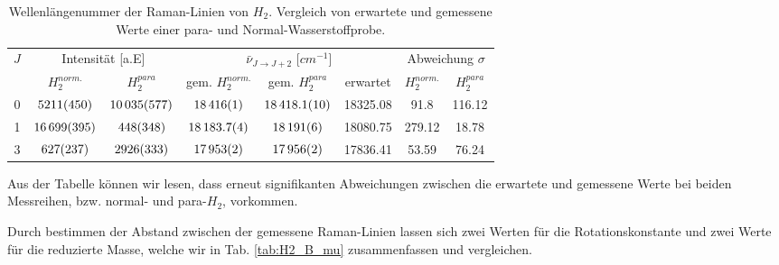 \documentclass[11 pt]{article}
\begin{document}
\begin{table}[!htbp]
 \begin{center}
  \caption{\small Wellenlängenummer der Raman-Linien von $H_2$. Vergleich von erwartete und gemessene Werte einer para- und Normal-Wasserstoffprobe.}
  \label{tab:H2}
  \renewcommand{\arraystretch}{1.3} %
  \begin{tabular}{|c|c|c|c|c|c|c|c|}
  \hline
\multirow{2}{*}{$J$}&\multicolumn{2}{c|}{Intensität [a.E]}& \multicolumn{3}{c|}{$\bar{\nu}_{J\to J+2}$ [$\unit{cm^{-1}}$]} & \multicolumn{2}{c|}{ Abweichung $\sigma$} \\ \cline{2-8} %
 					 &$H_2^{norm.}$	&	$H_2^{para}$ & gem. $H_2^{norm.}$ & gem. $H_2^{para}$& erwartet &  $H_2^{norm.}$	&	$H_2^{para}$\\ 
  \hline
	\hline 
0 &	$\num{5211\pm450}$ 	&	$\num{10035\pm577}$	&	$\num{18416	\pm 1}$	& $\num{18418.1\pm 1}$	& 18325.08	& 91.8	& 116.12 \\ 
1 & 	$\num{16699\pm395}$	&	$\num{448\pm348}$	&	$\num{18183.7\pm0.4}$& $\num{18191\pm6}$	& 18080.75	& 279.12	& 18.78 \\ 
3 &	$\num{627\pm237}$	&	$\num{2926\pm333}$	&	$\num{17953\pm2}$	& $\num{17956\pm2}$	& 17836.41	& 53.59	& 76.24\\ 
	\hline
  \end{tabular}
  \renewcommand{\arraystretch}{1}
 \end{center}
\end{table}



Aus der Tabelle können wir lesen, dass erneut signifikanten Abweichungen zwischen die erwartete und gemessene Werte bei beiden Messreihen, bzw. normal- und para-$H_2$, vorkommen.  

Durch bestimmen der Abstand zwischen der gemessene Raman-Linien lassen sich zwei Werten für die Rotationskonstante und zwei Werte für die reduzierte Masse, welche wir in Tab. \ref{tab:H2_B_mu} zusammenfassen und vergleichen. 
\end{document}
